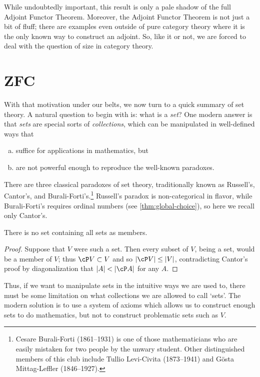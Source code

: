 \documentclass{amsart}
\begin{document}
While undoubtedly important, this result is only a pale shadow of the
full Adjoint Functor Theorem.  Moreover, the Adjoint Functor Theorem
is not just a bit of fluff; there are examples even outside of pure
category theory where it is the only known way to construct an
adjoint.  So, like it or not, we are forced to deal with the question
of size in category theory.


\section{ZFC}
\label{sec:zfc}

With that motivation under our belts, we now turn to a quick summary
of set theory.  A natural question to begin with is: what is a
\emph{set}?  One modern answer is that \emph{sets} are special sorts
of \emph{collections}, which can be manipulated in well-defined ways
that
\begin{enumerate}[(a)]
\item suffice for applications in mathematics, but
\item are not powerful enough to reproduce the well-known paradoxes.
\end{enumerate}
There are three classical paradoxes of set theory, traditionally known
as Russell's, Cantor's, and Burali-Forti's.\footnote{Cesare
  Burali-Forti (1861--1931) is one of those mathematicians who are
  easily mistaken for two people by the unwary student.  Other
  distinguished members of this club include Tullio Levi-Civita
  (1873--1941) and G\"osta Mittag-Leffler (1846--1927).}  Russell's
paradox is non-categorical in flavor, while Burali-Forti's requires
ordinal numbers (see \autoref{thm:global-choice}), so here we recall
only Cantor's.

\begin{thm}
  There is no set containing all sets as members.
\end{thm}
\begin{proof}
  Suppose that $V$ were such a set.  Then every subset of $V$, being a
  set, would be a member of $V$; thus $\cP V \subset V$ and so
  $|\cP V| \le |V|$, contradicting Cantor's proof by diagonalization
  that $|A|<|\cP A|$ for any $A$.
\end{proof}

Thus, if we want to manipulate sets in the intuitive ways we are used
to, there must be some limitation on what collections we are allowed
to call `sets'.  The modern solution is to use a system of axioms
which allows us to construct enough sets to do mathematics, but not to
construct problematic sets such as $V$.
\end{document}
